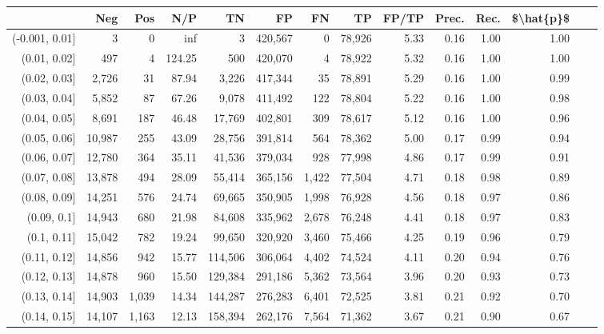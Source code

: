 \begin{tabular}{rrrrrrrrrrrrrr}
\toprule
{} &     Neg &    Pos &     N/P &       TN &       FP &      FN &      TP & FP/TP & Prec. &  Rec. & \$\textbackslash hat\{p\}\$ \\
\midrule
(-0.001, 0.01] &       3 &      0 &     inf &        3 &  420,567 &       0 &  78,926 &  5.33 &  0.16 &  1.00 &      1.00 \\
(0.01, 0.02]   &     497 &      4 &  124.25 &      500 &  420,070 &       4 &  78,922 &  5.32 &  0.16 &  1.00 &      1.00 \\
(0.02, 0.03]   &   2,726 &     31 &   87.94 &    3,226 &  417,344 &      35 &  78,891 &  5.29 &  0.16 &  1.00 &      0.99 \\
(0.03, 0.04]   &   5,852 &     87 &   67.26 &    9,078 &  411,492 &     122 &  78,804 &  5.22 &  0.16 &  1.00 &      0.98 \\
(0.04, 0.05]   &   8,691 &    187 &   46.48 &   17,769 &  402,801 &     309 &  78,617 &  5.12 &  0.16 &  1.00 &      0.96 \\
(0.05, 0.06]   &  10,987 &    255 &   43.09 &   28,756 &  391,814 &     564 &  78,362 &  5.00 &  0.17 &  0.99 &      0.94 \\
(0.06, 0.07]   &  12,780 &    364 &   35.11 &   41,536 &  379,034 &     928 &  77,998 &  4.86 &  0.17 &  0.99 &      0.91 \\
(0.07, 0.08]   &  13,878 &    494 &   28.09 &   55,414 &  365,156 &   1,422 &  77,504 &  4.71 &  0.18 &  0.98 &      0.89 \\
(0.08, 0.09]   &  14,251 &    576 &   24.74 &   69,665 &  350,905 &   1,998 &  76,928 &  4.56 &  0.18 &  0.97 &      0.86 \\
(0.09, 0.1]    &  14,943 &    680 &   21.98 &   84,608 &  335,962 &   2,678 &  76,248 &  4.41 &  0.18 &  0.97 &      0.83 \\
(0.1, 0.11]    &  15,042 &    782 &   19.24 &   99,650 &  320,920 &   3,460 &  75,466 &  4.25 &  0.19 &  0.96 &      0.79 \\
(0.11, 0.12]   &  14,856 &    942 &   15.77 &  114,506 &  306,064 &   4,402 &  74,524 &  4.11 &  0.20 &  0.94 &      0.76 \\
(0.12, 0.13]   &  14,878 &    960 &   15.50 &  129,384 &  291,186 &   5,362 &  73,564 &  3.96 &  0.20 &  0.93 &      0.73 \\
(0.13, 0.14]   &  14,903 &  1,039 &   14.34 &  144,287 &  276,283 &   6,401 &  72,525 &  3.81 &  0.21 &  0.92 &      0.70 \\
(0.14, 0.15]   &  14,107 &  1,163 &   12.13 &  158,394 &  262,176 &   7,564 &  71,362 &  3.67 &  0.21 &  0.90 &      0.67 \\

\end{tabular}
